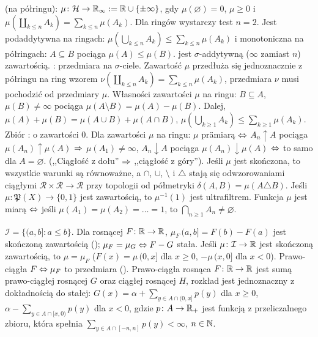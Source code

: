  (na półringu): $\mu \colon \mathcal H \to \mathbb{R}_\infty := \mathbb{R} \cup\{\pm \infty\}$, gdy $\mu(\varnothing) = 0$, $\mu \ge 0$ i $\mu(\coprod_{k \le n} A_k) = \sum_{k \le n} \mu(A_k)$.
Dla ringów wystarczy test $n = 2$.
Jest podaddytywna na ringach: $\mu(\bigcup_{k \le n} A_k ) \le \sum_{k \le n} \mu(A_k)$ i monotoniczna na półringach: $A \subseteq B$ pociąga $\mu(A) \le \mu(B)$.
 jest $\sigma$-addytywną ($\infty$ zamiast $n$) zawartością.
: przedmiara na $\sigma$-ciele.
Zawartość $\mu$ przedłuża się jednoznacznie z półringu na ring wzorem $\nu(\coprod_{k \le n} A_k) = \sum_{k \le n} \mu(A_k)$, przedmiara $\nu$ musi pochodzić od przedmiary $\mu$.
Własności zawartości $\mu$ na ringu: $B \subseteq A$, $\mu(B) \neq \infty$ pociąga $\mu(A \setminus B) = \mu(A) - \mu(B)$.
Dalej, $\mu(A) + \mu(B) = \mu(A \cup B) + \mu (A \cap B)$, $\mu(\bigcup_{k \ge 1} A_k) \le \sum_{k \ge 1} \mu(A_k)$.
Zbiór : o zawartości $0$.
Dla zawartości $\mu$ na ringu: $\mu$ prämiarą $\Leftrightarrow$ $A_n \uparrow A$ pociąga $\mu(A_n) \uparrow \mu(A)$ $\Rightarrow$ $\mu(A_1) \neq \infty$, $A_n \downarrow A$ pociąga $\mu(A_n) \downarrow \mu(A)$ 
$\Leftrightarrow$ to samo dla $A = \varnothing$.
(,,Ciągłość z dołu'' $\Rightarrow$ ,,ciągłość z góry'').
Jeśli $\mu$ jest skończona, to wszystkie warunki są równoważne, a $\cap$, $\cup$, $\setminus$ i $\triangle$ stają się odwzorowaniami ciągłymi $\mathcal R \times \mathcal R \to \mathcal R$ przy topologii od półmetryki $\delta(A, B) = \mu (A \triangle B)$.
Jeśli $\mu \colon \mathfrak P(X) \to \{0, 1\}$ jest zawartością, to $\mu^{-1}(1)$ jest ultrafiltrem.
Funkcja $\mu$ jest miarą $\Leftrightarrow$ jeśli $\mu(A_1) = \mu(A_2) = \ldots = 1$, to $\bigcap_{n \ge 1} A_n \neq \varnothing$.

$\mathcal I = \{(a,b] : a \le b\}$.
Dla  rosnącej $F \colon \mathbb{R} \to \mathbb{R}$, $\mu_F\,(a,b] = F(b) - F(a)$ jest skończoną zawartością (); $\mu_F = \mu_G \Leftrightarrow F - G$ stała.
Jeśli $\mu \colon \mathcal I \to \mathbb{R}$ jest skończoną zawartością, to $\mu = \mu_F$ ($F(x) = \mu\,(0,x]$ dla $x \ge 0$, $-\mu\,(x,0]$ dla $x < 0$).
Prawo-ciągła $F \Leftrightarrow \mu_F$ to przedmiara ().
Prawo-ciągła rosnąca $F \colon \mathbb{R} \to \mathbb{R}$ jest sumą prawo-ciągłej rosnącej  $G$ oraz ciągłej rosnącej $H$, rozkład jest jednoznaczny z dokładnością do stałej: $G(x) = \alpha + \sum_{y \in A \cap (0, x]} p(y)$ dla $x \ge 0$, $\alpha - \sum_{y \in A \cap [x, 0)} p(y)$ dla $x < 0$, gdzie $p \colon A \to \mathbb{R}_+$ jest funkcją z przeliczalnego zbioru, która spełnia $\sum_{y \in A \cap [-n, n]} p(y) < \infty$, $n \in \mathbb{N}$.


